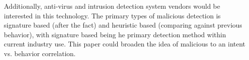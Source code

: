 \documentclass[conference]{IEEEtran}
\begin{document}
Additionally, anti-virus and intrusion detection system vendors would be interested in this technology. The primary types of malicious detection is signature based (after the fact) and heuristic based (comparing against previous behavior), with signature based being he primary detection method within current industry use. This paper could broaden the idea of malicious to an intent vs. behavior correlation. 

 

%
%


\end{document}
